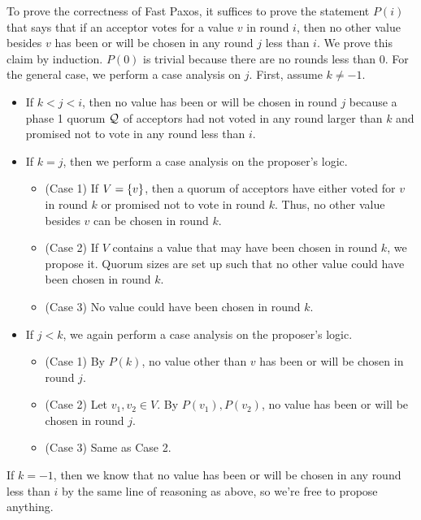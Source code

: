 To prove the correctness of Fast Paxos, it suffices to prove the statement
$P(i)$ that says that if an acceptor votes for a value $v$ in round $i$, then
no other value besides $v$ has been or will be chosen in any round $j$ less
than $i$. We prove this claim by induction. $P(0)$ is trivial because there are
no rounds less than $0$. For the general case, we perform a case analysis on
$j$. First, assume $k \neq -1$.
\begin{itemize}
  \item
    If $k < j < i$, then no value has been or will be chosen in round $j$
    because a phase 1 quorum $\mathcal{Q}$ of acceptors had not voted in any round
    larger than $k$ and promised not to vote in any round less than $i$.

  \item
    If $k = j$, then we perform a case analysis on the proposer's logic.
    \begin{itemize}
      \item
        (Case 1) If $V = \{v\}$, then a quorum of acceptors have either voted
        for $v$ in round $k$ or promised not to vote in round $k$. Thus, no
        other value besides $v$ can be chosen in round $k$.
      \item
        (Case 2) If $V$ contains a value that may have been chosen in round
        $k$, we propose it. Quorum sizes are set up such that no other value
        could have been chosen in round $k$.
      \item
        (Case 3) No value could have been chosen in round $k$.
    \end{itemize}

  \item
    If $j < k$, we again perform a case analysis on the proposer's logic.
    \begin{itemize}
      \item
        (Case 1) By $P(k)$, no value other than $v$ has been or will be chosen
        in round $j$.
      \item
        (Case 2) Let $v_1, v_2 \in V$. By $P(v_1), P(v_2)$, no value has been
        or will be chosen in round $j$.
      \item
        (Case 3) Same as Case 2.
    \end{itemize}
\end{itemize}
If $k = -1$, then we know that no value has been or will be chosen in any round
less than $i$ by the same line of reasoning as above, so we're free to propose
anything.

